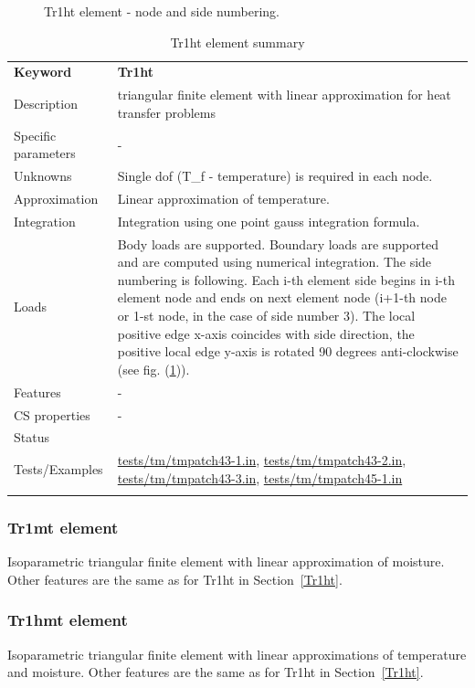 \documentclass[a4paper]{article}
\newcommand{\param}[1]{\texttt{#1}} %
\newcommand{\templabel}{}%
\newcommand{\tempcaption}{}%
\newcounter{nelpar}
\newenvironment{elementsummary}[5]{%
  \gdef\tempcaption{#4}%
  \gdef\templabel{#5}%
  \setcounter{nelpar}{0}%
  \begin{center} %
    \begin{table}[!htb] %
      \begin{tabular}{|l|p{9cm}|}\hline %
        {\bf Keyword} & \bf{#1}\\ %
        {Description} & {#2}\\ %
        {Specific parameters} & {#3}\\ \hline %
}{
  \\ \hline %
      \end{tabular}%
      \caption{\tempcaption}%
      \label{\templabel}%
    \end{table}%
  \end{center}%
}
\newcommand{\elementParam}[1]{%
  \ifthenelse{\value{nelpar}>0} %
             {&{#1}}%
             {\setcounter{nelpar}{1}Parameters&{#1}}%
             \\%
}
\newcommand{\elementDescription}[2]{{#1} & {#2}\\}
\begin{document}
\begin{figure}[htb]
 \centering
 \begin{makeimage}
  
 \end{makeimage}
 \caption{Tr1ht element - node and side numbering.}
 \label{Tr1htfig}
\end{figure}

\begin{elementsummary}{Tr1ht}{triangular finite element with linear approximation for heat transfer problems}{-}{Tr1ht element summary}{Tr1htsummary}
\elementDescription{Unknowns}{Single dof (T\_f - temperature) is required in each node.}
\elementDescription{Approximation}{Linear approximation of temperature.}
\elementDescription{Integration}{Integration using one point gauss integration formula.}
\elementDescription{Loads}{Body loads are supported. Boundary loads are
supported and are computed  using numerical integration. The side numbering is
following. Each i-th element side begins in i-th element node and
ends on next element node (i+1-th node or 1-st node, in the case of 
side number 3). The local positive edge x-axis coincides with side
direction, the positive local edge y-axis is rotated 90 degrees
anti-clockwise (see fig. (\ref{Tr1htfig})).}
\elementDescription{Features}{-}
\elementDescription{CS properties}{-}
\elementDescription{Status}{}
\elementDescription{Tests/Examples}{\href{https://github.com/oofem/oofem/blob/devel/tests/tm/tmpatch43-1.in}{tests/tm/tmpatch43-1.in},
  \href{https://github.com/oofem/oofem/blob/devel/tests/tm/tmpatch43-2.in}{tests/tm/tmpatch43-2.in},
  \href{https://github.com/oofem/oofem/blob/devel/tests/tm/tmpatch43-3.in}{tests/tm/tmpatch43-3.in},
  \href{https://github.com/oofem/oofem/blob/devel/tests/tm/tmpatch45-1.in}{tests/tm/tmpatch45-1.in}
}
\end{elementsummary}

\subsubsection{Tr1mt element}
Isoparametric triangular finite element with linear approximation of moisture.
Other features are the same as for Tr1ht in Section~\ref{Tr1ht}.

\subsubsection{Tr1hmt element}
Isoparametric triangular finite element with linear approximations of 
temperature and moisture. 
Other features are the same as for Tr1ht in Section~\ref{Tr1ht}.
\end{document}
